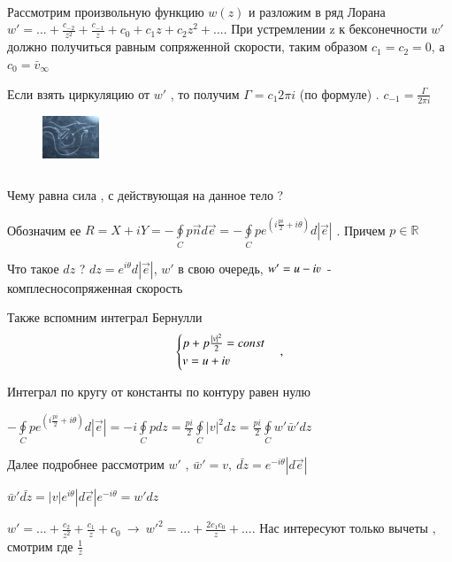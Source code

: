 \newpage
\ \\

Рассмотрим произвольную функцию $w(z)$ и разложим в ряд Лорана $w' = ... + \frac{c_{-2}}{z^2} + \frac{c_{-1}}{z} + c_0 + c_1 z + c_2 z^2 + ... $. При устремлении z к бексонечности $w'$ должно получиться равным сопряженной скорости, таким образом $c_1 = c_2 = 0$, а $c_0 = \bar{v}_{\infty}$

Если взять циркуляцию от $w'$ , то получим $\Gamma = c_1 2 \pi i $ (по формуле) . $c_{-1} = \frac{\Gamma}{2 \pi i}$

\begin{figure}
	\includegraphics[width=0.15\textwidth]{14/pic_9.png}
	\caption{\label{ris:image14.10}}
\end{figure}
$$ $$

Чему равна сила , с действующая на данное тело ? 

Обозначим ее $R = X + i Y = - 	\oint \limits_{C} p \overrightarrow{n} d \overrightarrow{e} = - \oint \limits_{C} p e^(i\frac{pi}{2} + i\theta) d | \overrightarrow{e} |$ . Причем $p \in \mathbb{R}$

Что такое $dz$ ? $dz = e^{i \theta} d | \overrightarrow{e} |$, $w'$  в свою очередь, $w' = u -i \varv$ -  комплесносопряженная скорость 

Также вспомним интеграл Бернулли
$$ \begin{cases}
	p + p \frac{|v|^2}{2} = const \\
	v = u + i \varv
\end{cases},$$

Интеграл по кругу от константы по контуру равен нулю 

$- \oint \limits_{C} p e^(i\frac{pi}{2} + i\theta) d | \overrightarrow{e} | = -i \oint  \limits_{C} p dz = \frac{p i}{2} \oint  \limits_{C} |v|^2 dz =  \frac{p i}{2} \oint  \limits_{C} w' \bar{w}' d z$

Далее подробнее рассмотрим $w'$ , $\bar{w}' = v, \ \bar{d z} = e^{-i \theta} |d \overrightarrow{e} |$

$\bar{w}' \bar{dz} = |v| e^{i \theta} |d \overrightarrow{e} | e^{-i \theta} = w' dz$

$w' = ... + \frac{c_2}{z^2} + \frac{c_1}{z} + c_0 \ \rightarrow \ w'^2 = ... + \frac{2 c_1 c_0}{z} + ...$. Нас интересуют только вычеты , смотрим где $\frac{1}{z}$ 


